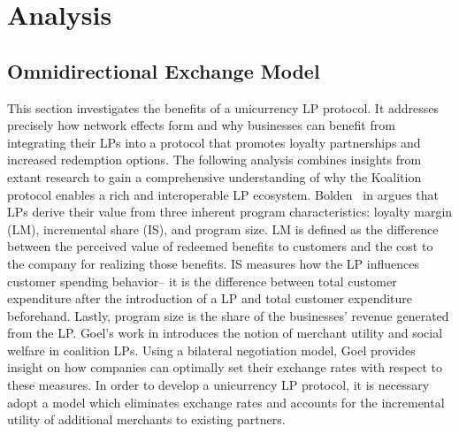 \section{Analysis} \label{sec:analysis}
\subsection{Omnidirectional Exchange Model}
%
This section investigates the benefits of a unicurrency LP protocol. It addresses precisely how network effects form and why businesses can benefit from integrating their LPs into a protocol that promotes loyalty partnerships and increased redemption options. The following analysis combines insights from extant research to gain a comprehensive understanding of why the Koalition protocol enables a rich and interoperable LP ecosystem. Bolden \etal\ in \cite{Bolden14} argues that LPs derive their value from three inherent program characteristics: loyalty margin (LM), incremental share (IS), and program size. LM is defined as the difference between the perceived value of redeemed benefits to customers and the cost to the company for realizing those benefits. IS measures how the LP influences customer spending behavior-- it is the difference between total customer expenditure after the introduction of a LP and total customer expenditure beforehand. Lastly, program size is the share of the businesses' revenue generated from the LP. Goel's work in \cite{Goel17} introduces the notion of merchant utility and social welfare in coalition LPs. Using a bilateral negotiation model, Goel provides insight on how companies can optimally set their exchange rates with respect to these measures. In order to develop a unicurrency LP protocol, it is necessary adopt a model which eliminates exchange rates and accounts for the incremental utility of additional merchants to existing partners. %

